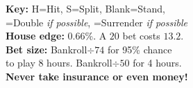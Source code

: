 \documentclass[letterpaper]{article}
\begin{document}
{\begin{minipage}[t][81mm][t]{49.5mm}
        \textbf{Key:} H=Hit,\; S=Split,\; Blank=Stand,\\
        {
            \setlength{\fboxsep}{2pt}
            \colorbox{doubleblue}{\phantom{I}}=Double \textit{if possible}, 
            \colorbox{surrenderred}{\phantom{I}}=Surrender \textit{if possible}
        }\\
        \textbf{House edge:} 0.66\%. A \textdollar\(20\) bet costs \(13.2\)\textcent.\\
        \textbf{Bet size:} Bankroll\(\div74\) for 95\% chance\\
        to play 8 hours. Bankroll\(\div50\) for 4 hours.\\
        \textbf{Never take insurance or even money!}
    \end{minipage}
}

\pagebreak
\end{document}
